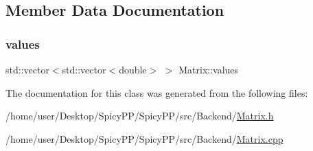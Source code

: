 \subsection{Member Data Documentation}
\mbox{\label{classMatrix_a5987175ae045377790ff0b1f6cfd2e7b}} 
\subsubsection{\texorpdfstring{values}{values}}
{\footnotesize\ttfamily std\+::vector$<$std\+::vector$<$double$>$ $>$ Matrix\+::values\hspace{0.3cm}{\ttfamily [private]}}



The documentation for this class was generated from the following files\+:\begin{DoxyCompactItemize}
\item 
/home/user/\+Desktop/\+Spicy\+P\+P/\+Spicy\+P\+P/src/\+Backend/\hyperlink{Matrix_8h}{Matrix.\+h}\item 
/home/user/\+Desktop/\+Spicy\+P\+P/\+Spicy\+P\+P/src/\+Backend/\hyperlink{Matrix_8cpp}{Matrix.\+cpp}\end{DoxyCompactItemize}
